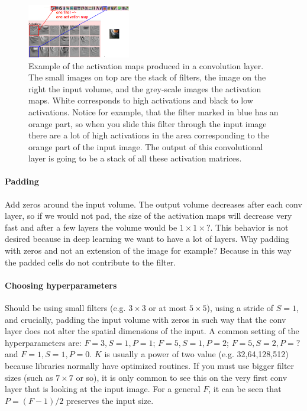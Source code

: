 \begin{figure}[h]
  \centering
  \includegraphics[width=0.4\textwidth]{Images/conv_layer/3.png}
  \caption{Example of the activation maps produced in a convolution layer. The small images on top are the stack of filters, the image on the right the input volume, and the grey-scale images the activation maps. White corresponds to high activations and black to low activations. Notice for example, that the filter marked in blue has an orange part, so when you slide this filter through the input image there are a lot of high activations in the area corresponding to the orange part of the input image. The output of this convolutional layer is going to be a stack of all these activation matrices.}
\end{figure}

\paragraph*{Padding} Add zeros around the input volume. The output volume decreases after each conv layer, so if we would not pad, the size of the activation maps will decrease very fast and after a few layers the volume would be $1 \times 1 \times ?$. This behavior is not desired because in deep learning we want to have a lot of layers. Why padding with zeros and not an extension of the image for example? Because in this way the padded cells do not contribute to the filter.

\paragraph*{Choosing hyperparameters} Should be using small filters (e.g. $3 \times 3$ or at most $5 \times 5$), using a stride of $S=1$, and crucially, padding the input volume with zeros in such way that the conv layer does not alter the spatial dimensions of the input. A common setting of the hyperparameters are: $F=3,S=1,P=1$; $F=5,S=1,P=2$; $F=5,S=2,P=?$and $F=1,S=1,P=0$. $K$ is usually a power of two value (e.g. 32,64,128,512) because libraries normally have optimized routines. If you must use bigger filter sizes (such as $7 \times 7$ or so), it is only common to see this on the very first conv layer that is looking at the input image. For a general $F$, it can be seen that $P=(F-1)/2$ preserves the input size.

